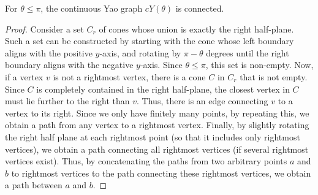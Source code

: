 \documentclass{cccg14}
\newcommand{\cyao}{\ensuremath{cY(\theta)}\xspace}
\begin{document}
\begin{theorem}\label{theorem: cyan pi is connected}
 For $\theta \leq \pi$, the continuous Yao graph \cyao is connected.
\end{theorem}
\begin{proof}
 Consider a set $C_r$ of cones whose union is exactly the right half-plane. Such a set can be constructed by starting with the cone whose left boundary aligns with the positive $y$-axis, and rotating by $\pi - \theta$ degrees until the right boundary aligns with the negative $y$-axis. Since $\theta \leq \pi$, this set is non-empty. 
 Now, if a vertex $v$ is not a rightmost vertex, there is a cone $C$ in $C_r$ that is not empty. Since $C$ is completely contained in the right half-plane, the closest vertex in $C$ must lie further to the right than $v$. Thus, there is an edge connecting $v$ to a vertex to its right. Since we only have finitely many points, by repeating this, we obtain a path from any vertex to a rightmost vertex. Finally, by slightly rotating the right half plane at each rightmost point (so that it includes only rightmost vertices), we obtain a path connecting all rightmost vertices (if several rightmost vertices exist). 
 Thus, by concatenating the paths from two arbitrary points $a$ and $b$ to rightmost vertices to the path connecting these rightmost vertices, we obtain a path between $a$ and $b$.
\end{proof}
\end{document}
